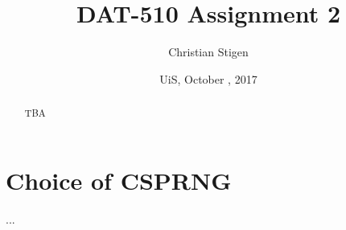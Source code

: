 \documentclass[a4paper,english,12pt]{article}
\title{DAT-510 Assignment 2}
\author{Christian Stigen}
\date{UiS, October \nth{9}, 2017}
\begin{document}
\maketitle

\begin{abstract}
  TBA
\end{abstract}

\section{Choice of CSPRNG}
...

\cite{test}



\end{document}
